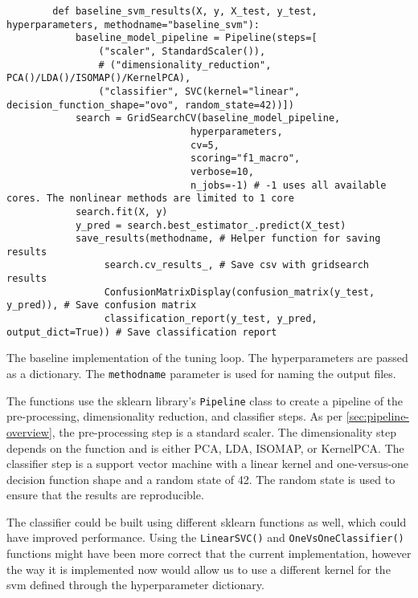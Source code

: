 \begin{listing}[htb!]
    \centering
    \begin{verbatim}
        def baseline_svm_results(X, y, X_test, y_test, hyperparameters, methodname="baseline_svm"):
            baseline_model_pipeline = Pipeline(steps=[
                ("scaler", StandardScaler()),
                # ("dimensionality_reduction", PCA()/LDA()/ISOMAP()/KernelPCA),
                ("classifier", SVC(kernel="linear", decision_function_shape="ovo", random_state=42))])
            search = GridSearchCV(baseline_model_pipeline,
                                hyperparameters,
                                cv=5,
                                scoring="f1_macro",
                                verbose=10,
                                n_jobs=-1) # -1 uses all available cores. The nonlinear methods are limited to 1 core
            search.fit(X, y)
            y_pred = search.best_estimator_.predict(X_test)
            save_results(methodname, # Helper function for saving results
                 search.cv_results_, # Save csv with gridsearch results
                 ConfusionMatrixDisplay(confusion_matrix(y_test, y_pred)), # Save confusion matrix
                 classification_report(y_test, y_pred, output_dict=True)) # Save classification report
    \end{verbatim}
    \caption{The baseline implementation of the tuning loop. The hyperparameters are passed as a dictionary. The \texttt{methodname} parameter is used for naming the output files.}
    \label{lst:baseline-svm-results}
\end{listing}


The functions use the \gls{sklearn} library's \texttt{Pipeline} class to create a pipeline of the pre-processing, dimensionality reduction, and classifier steps. As per \autoref{sec:pipeline-overview}, the pre-processing step is a standard scaler. The dimensionality step depends on the function and is either PCA, LDA, ISOMAP, or KernelPCA. The classifier step is a support vector machine with a linear kernel and one-versus-one decision function shape and a random state of 42. The random state is used to ensure that the results are reproducible.

The classifier could be built using different \gls{sklearn} functions as well, which could have improved performance. Using the \texttt{LinearSVC()} and \texttt{OneVsOneClassifier()} functions might have been more correct that the current implementation, however the way it is implemented now would allow us to use a different kernel for the \gls{svm} defined through the hyperparameter dictionary.

